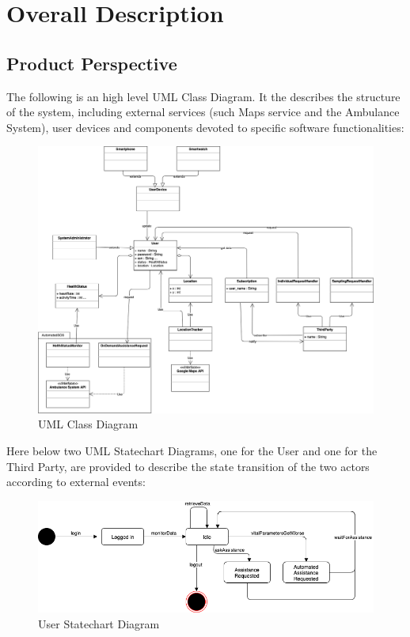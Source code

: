 \documentclass[12pt,a4paper]{article}
\begin{document}
	\newpage
	\section{Overall Description}

		\subsection{Product Perspective}
			The following is an high level UML Class Diagram. It the describes the structure of the system, including external services (such Maps service and the Ambulance System), user devices and components devoted to specific software functionalities: 
			\begin{figure}[h]
				\centering
				\includegraphics[width=1.25\linewidth]{Images/uml}
				\caption{UML Class Diagram}
				\label{fig:uml}
			\end{figure}
			\newpage
			Here below two UML Statechart Diagrams, one for the User and one for the Third Party, are provided to describe the state transition of the two actors according to external events: 
			\begin{figure}[H]
				\centering
				\includegraphics[width=1.0\linewidth]{Images/statechart_user}
				\caption{User Statechart Diagram}
				\label{fig:statechart_user}
			\end{figure}
\end{document}
